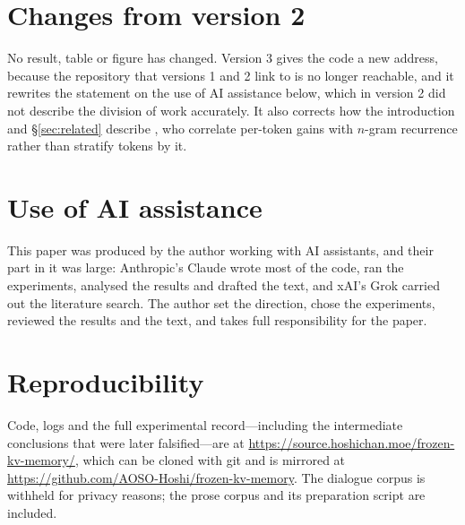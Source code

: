 \documentclass[11pt]{article}
\begin{document}
\section*{Changes from version 2}

No result, table or figure has changed. Version 3 gives the code a new address,
because the repository that versions 1 and 2 link to is no longer reachable, and
it rewrites the statement on the use of AI assistance below, which in version 2
did not describe the division of work accurately. It also corrects how the
introduction and \S\ref{sec:related} describe \citet{tokensbenefit}, who correlate
per-token gains with $n$-gram recurrence rather than stratify tokens by it.

\section*{Use of AI assistance}

This paper was produced by the author working with AI assistants, and their part
in it was large: Anthropic's Claude wrote most of the code, ran the experiments,
analysed the results and drafted the text, and xAI's Grok carried out the
literature search. The author set the direction, chose the experiments, reviewed
the results and the text, and takes full responsibility for the paper.

\section*{Reproducibility}

Code, logs and the full experimental record---including the intermediate
conclusions that were later falsified---are at
\url{https://source.hoshichan.moe/frozen-kv-memory/}, which can be cloned with git
and is mirrored at \url{https://github.com/AOSO-Hoshi/frozen-kv-memory}. The
dialogue corpus is
withheld for privacy reasons; the prose corpus and its preparation script are
included.



\end{document}

